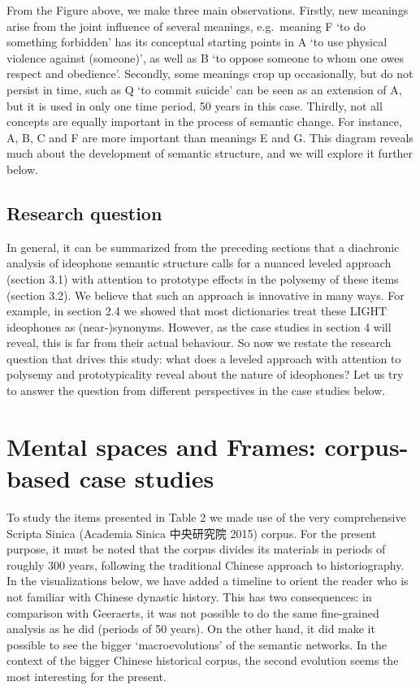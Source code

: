From the Figure above, we make three main observations. Firstly, new
meanings arise from the joint influence of several meanings,
e.g.~meaning F `to do something forbidden' has its conceptual starting
points in A `to use physical violence against (someone)', as well as B
`to oppose someone to whom one owes respect and obedience'. Secondly,
some meanings crop up occasionally, but do not persist in time, such as
Q `to commit suicide' can be seen as an extension of A, but it is used
in only one time period, 50 years in this case. Thirdly, not all
concepts are equally important in the process of semantic change. For
instance, A, B, C and F are more important than meanings E and G. This
diagram reveals much about the development of semantic structure, and we
will explore it further below.

\subsection{Research question}\label{research-question}

In general, it can be summarized from the preceding sections that a
diachronic analysis of ideophone semantic structure calls for a nuanced
leveled approach (section 3.1) with attention to prototype effects in
the polysemy of these items (section 3.2). We believe that such an
approach is innovative in many ways. For example, in section 2.4 we
showed that most dictionaries treat these LIGHT ideophones as
(near-)synonyms. However, as the case studies in section 4 will reveal,
this is far from their actual behaviour. So now we restate the research
question that drives this study: what does a leveled approach with
attention to polysemy and prototypicality reveal about the nature of
ideophones? Let us try to answer the question from different
perspectives in the case studies below.

\section{Mental spaces and Frames: corpus-based case
studies}\label{mental-spaces-and-frames-corpus-based-case-studies}

To study the items presented in Table 2 we made use of the very
comprehensive Scripta Sinica (Academia Sinica 中央研究院 2015) corpus.
For the present purpose, it must be noted that the corpus divides its
materials in periods of roughly 300 years, following the traditional
Chinese approach to historiography. In the visualizations below, we have
added a timeline to orient the reader who is not familiar with Chinese
dynastic history. This has two consequences: in comparison with
Geeraerts, it was not possible to do the same fine-grained analysis as
he did (periods of 50 years). On the other hand, it did make it possible
to see the bigger `macroevolutions' of the semantic networks. In the
context of the bigger Chinese historical corpus, the second evolution
seems the most interesting for the present.


